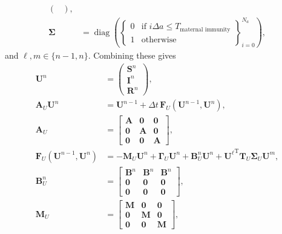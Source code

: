 \documentclass{article}
\renewcommand{\vec}[1]{\mathbf{#1}}
\newcommand{\mat}[1]{\mathbf{#1}}
\newcommand{\mT}{\mathrm{T}}
\DeclareMathOperator{\diag}{diag}
\begin{document}
\begin{equation}
\begin{split}
\begin{pmatrix}
    \end{pmatrix},
    \\
    \mat{\Sigma} &= \diag\left(
      \left\{
        \begin{array}{ll}
          0 & \text{if $i \Delta a \leq T_{\text{maternal immunity}}$}
          \\
          1 & \text{otherwise}
        \end{array}
      \right\}_{i = 0}^{N_a}
    \right),
  \end{split}
\end{equation}
and $\ell, m \in \{n - 1, n\}$.  Combining these gives
\begin{equation}
  \begin{split}
    \vec{U}^n &=
    \begin{pmatrix}
      \vec{S}^n
      \\
      \vec{I}^n
      \\
      \vec{R}^n
    \end{pmatrix},
    \\
    \mat{A}_U \vec{U}^n
    &=
    \vec{U}^{n - 1}
    + \Delta t \, \vec{F}_U(\vec{U}^{n - 1}, \vec{U}^n),
    \\
    \mat{A}_U &=
    \begin{bmatrix}
      \mat{A} & \mat{0} & \mat{0}
      \\
      \mat{0} & \mat{A} & \mat{0}
      \\
      \mat{0} & \mat{0} & \mat{A}
    \end{bmatrix},
    \\
    \vec{F}_U(\vec{U}^{n - 1}, \vec{U}^n) &=
    - \mat{M}_U \vec{U}^n  + \mat{\Gamma}_U \vec{U}^n
    + \mat{B}_U^n \vec{U}^n
    + {\vec{U}^{\ell}}^{\mT} \vec{T}_U \mat{\Sigma}_U \vec{U}^m,
    \\
    \mat{B}_U^n &=
    \begin{bmatrix}
      \mat{B}^n & \mat{B}^n & \mat{B}^n
      \\
      \mat{0} & \mat{0} & \mat{0}
      \\
      \mat{0} & \mat{0} & \mat{0}
    \end{bmatrix},
    \\
    \mat{M}_U &=
    \begin{bmatrix}
      \mat{M} & \mat{0} & \mat{0}
      \\
      \mat{0} & \mat{M} & \mat{0}
      \\
      \mat{0} & \mat{0} & \mat{M}
    \end{bmatrix},
    \\

\end{split}
\end{equation}
\end{document}

